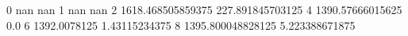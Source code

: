 0 nan nan
1 nan nan
2 1618.468505859375 227.891845703125
4 1390.57666015625 0.0
6 1392.0078125 1.43115234375
8 1395.800048828125 5.223388671875
